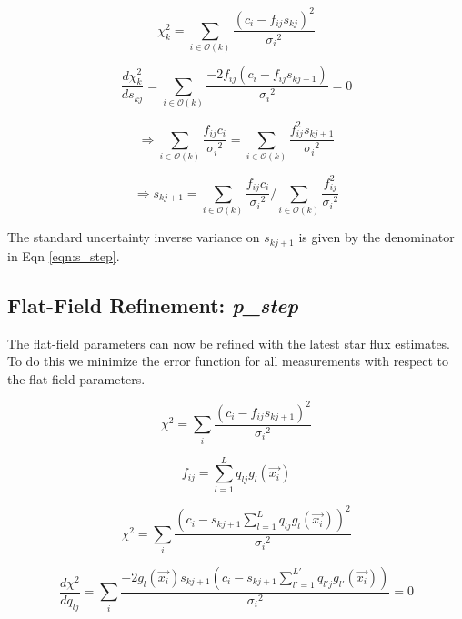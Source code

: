 \documentclass[12pt,a4paper,twoside]{article}
\begin{document}
\begin{equation}
\chi^2_{k} = \sum_{i \in \mathcal{O}(k)} \frac{(c_i-f_{ij}s_{kj})^2}{{\sigma_i}^2}
\end{equation}

\begin{equation}
\frac{d\chi^2_{k}}{d s_{kj}} = \sum_{i \in \mathcal{O}(k)} \frac{-2 f_{ij} (c_i-f_{ij}s_{kj+1})}{{\sigma_i}^2} = 0
\end{equation}

\begin{equation}
\Rightarrow \sum_{i \in \mathcal{O}(k)} \frac{f_{ij} c_i}{{\sigma_i}^2}= \sum_{i \in \mathcal{O}(k)} \frac{f_{ij}^2 s_{kj+1}}{{\sigma_i}^2}
\end{equation}

\begin{equation}
\Rightarrow s_{kj+1} = {\sum_{i \in \mathcal{O}(k)} \frac{f_{ij} c_i}{{\sigma_i}^2}}/{\sum_{i \in \mathcal{O}(k)} \frac{f_{ij}^2}{{\sigma_i}^2}} \label{eqn:s_step}
\end{equation}

The standard uncertainty inverse variance on $s_{kj+1}$ is given by the denominator in Eqn \ref{eqn:s_step}.

\subsection{Flat-Field Refinement: \textbf{\textit{p\_step}}}
The flat-field parameters can now be refined with the latest star flux estimates. To do this we minimize the error function for all measurements with respect to the flat-field parameters.

\begin{equation}
\chi^2 = \sum_{i} \frac{(c_i-f_{ij}s_{kj+1})^2}{{\sigma_i}^2}
\end{equation}

\begin{equation}
f_{ij} = \sum_{l = 1}^L q_{lj} g_l(\vec{x_i})
\end{equation}

\begin{equation}
\chi^2 = \sum_{i} \frac{(c_i- s_{kj+1} \sum_{l = 1}^L q_{lj} g_l(\vec{x_i}))^2}{{\sigma_i}^2}
\end{equation}

\begin{equation}
\frac{d\chi^2}{dq_{lj}} = \sum_{i} \frac{-2 g_l(\vec{x_i}) s_{kj+1} (c_i- s_{kj+1} \sum_{l' = 1}^{L'} q_{l'j} g_{l'}(\vec{x_i}))}{{\sigma_i}^2} = 0
\end{equation}
\end{document}
